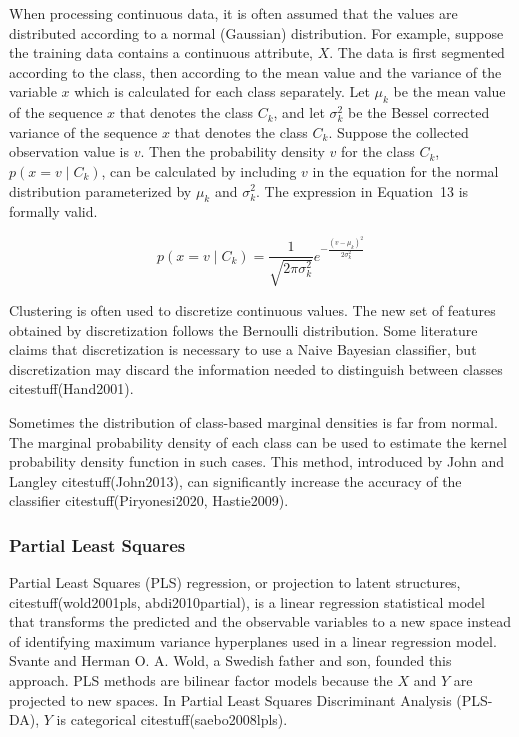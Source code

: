 \documentclass[preprint,12pt]{elsarticle}
\begin{document}
When processing continuous data, it is often assumed that the values are distributed according to a normal (Gaussian) distribution. For example, suppose the training data contains a continuous attribute, $X$. The data is first segmented according to the class, then according to the mean value and the variance of the variable $x$ which is calculated for each class separately. Let $\mu_{k}$ be the mean value of the sequence $x$ that denotes the class $C_{k}$, and let $\sigma_{k}^{2}$ be the Bessel corrected variance of the sequence $x$ that denotes the class $C_{k}$. Suppose the collected observation value is $v$. Then the probability density $v$ for the class $C_{k}$, $p(x=v\mid C_{k})$, can be calculated by including $v$ in the equation for the normal distribution parameterized by $\mu_{k}$ and $\sigma_{k}^{2}$. The expression in Equation~13 is formally valid.

\begin{equation}
	p(x=v\mid C_{k}) = \frac{1}{\sqrt{2\pi \sigma_{k}^{2}}} e^{-\frac{{(v-\mu_{k})}^{2}}{2\sigma_{k}^{2}}}
	\label{eqn:13}
\end{equation}

Clustering is often used to discretize continuous values. The new set of features obtained by discretization follows the Bernoulli distribution. Some literature claims that discretization is necessary to use a Naive Bayesian classifier, but discretization may discard the information needed to distinguish between classes citestuff(Hand2001).

Sometimes the distribution of class-based marginal densities is far from normal. The marginal probability density of each class can be used to estimate the kernel probability density function in such cases. This method, introduced by John and Langley citestuff(John2013), can significantly increase the accuracy of the classifier citestuff(Piryonesi2020, Hastie2009).

\subsubsection{Partial Least Squares}

Partial Least Squares (PLS) regression, or projection to latent structures, citestuff(wold2001pls, abdi2010partial), is a linear regression statistical model that transforms the predicted and the observable variables to a new space instead of identifying maximum variance hyperplanes used in a linear regression model. Svante and Herman O. A. Wold, a Swedish father and son, founded this approach. PLS methods are bilinear factor models because the $X$ and $Y$ are projected to new spaces. In Partial Least Squares Discriminant Analysis (PLS-DA), $Y$ is categorical citestuff(saebo2008lpls).
\end{document}

